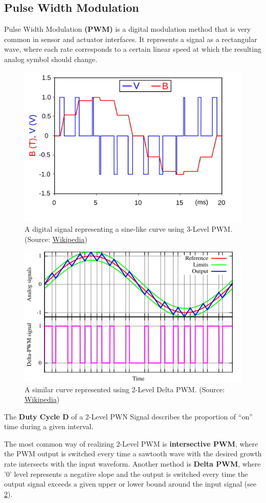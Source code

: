 \documentclass{report}
\newcommand{\tbf}{\textbf}
\newcommand*{\newpar}{\par\vspace{\baselineskip}\noindent} %
\begin{document}
\subsection{Pulse Width Modulation}
Pulse Width Modulation \tbf{(PWM)} is a digital modulation method that is very common in sensor and actuator interfaces. It represents a signal as a rectangular wave, where each rate corresponds to a certain linear speed at which the resulting analog symbol should change.
\begin{figure}[h!]
\centering
\includegraphics[scale=0.15]{figures/3StatePWM.png}
\caption{A digital signal representing a sine-like curve using 3-Level PWM. (Source: \href{https://en.wikipedia.org/wiki/File:PWM,_3-level.svg}{Wikipedia})}
\label{fig:3StatePWM}
\end{figure}
\begin{figure}[h!]
\centering
\includegraphics[scale=0.5]{figures/DeltaPWM.png}
\caption{A similar curve represented using 2-Level Delta PWM. (Source: \href{https://en.wikipedia.org/wiki/File:Delta_PWM.svg}{Wikipedia})}
\label{fig:DeltaPWM}
\end{figure}
\newpar
The \tbf{Duty Cycle D} of a 2-Level PWN Signal describes the proportion of ``on'' time during a given interval.
\newpar
The most common way of realizing 2-Level PWM is \tbf{intersective PWM}, where the PWM output is switched every time a sawtooth wave with the desired growth rate intersects with the input waveform. Another method is \tbf{Delta PWM}, where '0' level represents a negative slope and the output is switched every time the output signal exceeds a given upper or lower bound around the input signal (see \ref{fig:DeltaPWM}).
%
\end{document}
